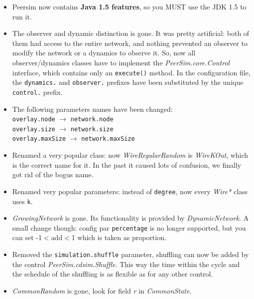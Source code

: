 \documentclass[a4paper,11pt]{article}
\begin{document}
\begin{itemize}

\item Peersim now contains \textbf{Java 1.5 features}, so you MUST use
  the JDK 1.5 to run it. 

\item The observer and dynamic distinction is gone. It was pretty artificial:
  both of them had access to the entire network, and nothing prevented
  an observer to modify the network or a dynamics to observe it. So,
  now all observer/dynamics classes have to implement the 
  \emph{PeerSim.core.Control} interface, which contains only an
  \texttt{execute()} 
  method. In the configuration file, the \texttt{dynamics.} and
  \texttt{observer.} 
  prefixes have been substituted by the unique \texttt{control.} prefix. 

\item The following parameters names have been changed:\\
  \texttt{overlay.node} $\to$ \texttt{network.node}\\
  \texttt{overlay.size} $\to$ \texttt{network.size}\\
  \texttt{overlay.maxSize} $\to$ \texttt{network.maxSize}

\item Renamed a very popular class: now \emph{WireRegularRandom} is
  \emph{WireKOut}, which 
  is the correct name for it. In the past it caused lots of confusion, we
  finally got rid of the bogus name.

\item Renamed very popular parameters: instead of \texttt{degree}, now
  every \emph{Wire*}  
  class uses \texttt{k}.

\item \emph{GrowingNetwork} is gone. Its functionality is provided by 
  \emph{DynamicNetwork}. A small change though: config par
  \texttt{percentage} is no longer  
  supported, but you can set -1$<$add$<$1 which is taken as proportion.

\item Removed the \texttt{simulation.shuffle} parameter, shuffling can now be
  added by the control \emph{PeerSim.cdsim.Shuffle}. This way the time
  within the cycle and 
  the schedule of the shuffling is as flexible as for any other control.

\item \emph{CommonRandom} is gone, look for field \emph{r} in
  \emph{CommonState}.


\end{itemize}
\end{document}
